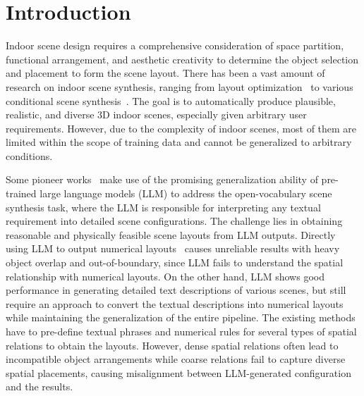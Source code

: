 \section{Introduction}



Indoor scene design requires a comprehensive consideration of space partition, functional arrangement, and aesthetic creativity to determine the object selection and placement to form the scene layout. There has been a vast amount of research on indoor scene synthesis, ranging from layout optimization~\cite{Yu2011MakeIH, Merrell2011InteractiveFL, Qi2018HumanCentricIS} to various conditional scene synthesis~\cite{Wang2018DeepCP, Paschalidou2021ATISSAT, Gao2023SceneHGNHG, Tang2023DiffuSceneSG}. The goal is to automatically produce plausible, realistic, and diverse 3D indoor scenes, especially
given arbitrary user requirements. However, due to the complexity of indoor scenes, most of them are limited within the scope of training data and cannot be generalized to arbitrary conditions.

Some pioneer works~\cite{Feng2023LayoutGPTCV, Wen2023AnyHomeOG, Yang2023HolodeckLG} make use of the promising generalization ability of pre-trained large language models (LLM) to address the open-vocabulary scene synthesis task, where the LLM is responsible for interpreting any textual requirement into detailed scene configurations. The challenge lies in obtaining reasonable and physically feasible scene layouts from LLM outputs. Directly using LLM to output numerical layouts~\cite{Feng2023LayoutGPTCV} causes unreliable results with heavy object overlap and out-of-boundary, since LLM fails to understand the spatial relationship with numerical layouts. On the other hand, LLM shows good performance in generating detailed text descriptions of various scenes, but still require an approach to convert the textual descriptions into numerical layouts while maintaining the generalization of the entire pipeline. The existing methods~\cite{Wen2023AnyHomeOG, Yang2023HolodeckLG} have to pre-define textual phrases and numerical rules for several types of spatial relations to obtain the layouts. However, dense spatial relations often lead to incompatible object arrangements while coarse relations fail to capture diverse spatial placements, causing misalignment between LLM-generated configuration and the results. 


